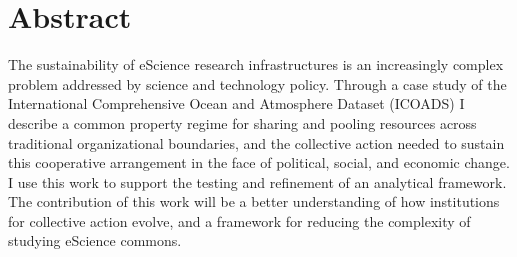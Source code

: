 \section{Abstract}

The sustainability of eScience research infrastructures is an increasingly complex problem addressed by science and technology policy. Through a case study of the International Comprehensive Ocean and Atmosphere Dataset (ICOADS) I describe a common property regime for sharing and pooling resources across traditional organizational boundaries, and the collective action needed to sustain this cooperative arrangement in the face of political, social, and economic change. I use this work to support the testing and refinement of an analytical framework. The contribution of this work will be a better understanding of how institutions for collective action evolve, and a framework for reducing the complexity of studying eScience commons.
